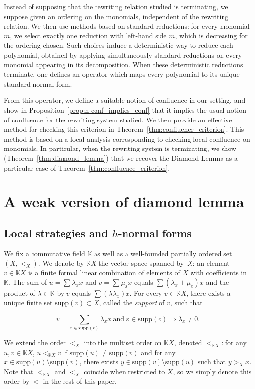 \documentclass[10pt]{easychair}
\theoremstyle{definition}
\newcommand\secDeux{A weak version of diamond lemma}
\newcommand\secDeuxUn{Local strategies and $h$-normal forms}
\newcommand\supp{\text{supp}}
\newcommand\K{\mathbb{K}}
\newcommand\KX{\K X}
\begin{document}
Instead of supposing that the rewriting relation studied is
terminating, we suppose given an ordering on the monomials,
independent of the rewriting relation.  We then use methods based on
standard reductions: for every monomial $m$, we select exactly one
reduction with left-hand side $m$, which is decreasing for the
ordering chosen. Such choices induce a deterministic way to reduce
each polynomial, obtained by applying simultaneously standard
reductions on every monomial appearing in its decomposition. When
these deterministic reductions terminate, one defines an operator
which maps every polynomial to its unique standard normal form.

From this operator, we define a suitable notion of confluence in
our setting, and show in Proposition~\ref{prop:h-conf_implies_conf}
that it implies the usual notion of confluence for the rewriting
system studied. We then provide an effective method for checking this
criterion in Theorem~\ref{thm:confluence_criterion}. This method is
based on a local analysis corresponding to checking local confluence
on monomials. In particular, when the rewriting system is terminating,
we show (Theorem~\ref{thm:diamond_lemma}) that we recover the Diamond
Lemma as a particular case of Theorem~\ref{thm:confluence_criterion}.

\section{\secDeux}\label{sec:deux}

\subsection{\secDeuxUn}\label{sec:deuxUn}

We fix a commutative field $\K$ as well as a well-founded partially ordered set
$(X,<_X)$. We denote by $\KX$ the vector space spanned by~$X$: an element
$v\in\KX$ is a finite formal linear combination of elements of $X$ with
coefficients in $\K$.  The sum of
$u=\sum\lambda_xx$ and $v=\sum\mu_xx$ equals $\sum(\lambda_x+\mu_x)x$ and
the product of $\lambda\in\K$ by $v$ equals $\sum(\lambda\lambda_x)x$.
For every $v\in\KX$, there exists a
unique finite set $\supp(v)\subset X$, called the \emph{support} of $v$,
such that
\begin{small}
  \begin{equation}\label{equ:support}
    v=\sum_{x\in\supp(v)}\lambda_xx\ \text{and}\ x\in\supp(v)\Rightarrow\lambda_x
    \neq 0.
  \end{equation}
\end{small}
\smallskip
\noindent
We
extend the order $<_X$ into the multiset order on $\KX$, denoted $<_{\KX}$:
for any $u,v \in \KX$, $u<_{\KX}v$ if $\supp(u) \neq \supp(v)$ and for any $x\in\supp(u)\setminus\supp(v)$, there
exists $y\in\supp(v)\setminus\supp(u)$ such that $y>_Xx$. Note that $<_{\KX}$ and $<_X$ coincide when restricted to $X$,
so we simply denote this order by $<$ in the rest of this paper.
\end{document}
